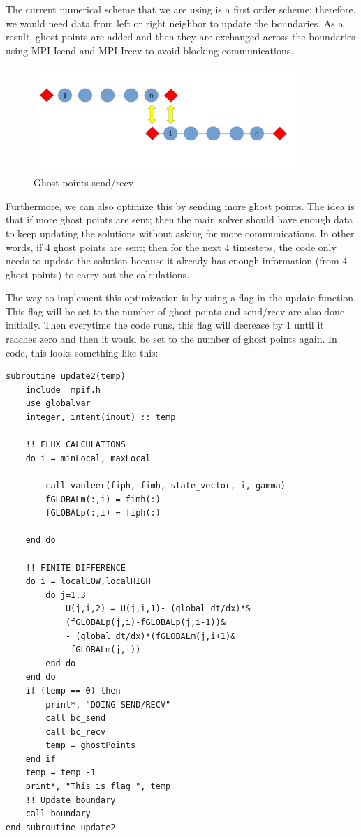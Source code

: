 \documentclass[12pt]{article}
\begin{document}
    \noindent
    The current numerical scheme that we are using is a first order scheme; therefore, we would need data from left or right neighbor to update the boundaries.  As a result, ghost points are added and then they are exchanged across the boundaries using MPI Isend and MPI Irecv to avoid blocking communications.    

    \begin{figure}[H]
        \begin{center}
        \includegraphics[height = 40mm,width = 100mm]{ghost.png}              
        \caption{Ghost points send/recv}
        \end{center}  
    \end{figure}       

    \noindent
    Furthermore, we can also optimize this by sending more ghost points.  The idea is that if more ghost points are sent; then the main solver should have enough data to keep updating the solutions without asking for more communications.  In other words, if 4 ghost points are sent; then for the next 4 timesteps, the code only needs to update the solution because it already has enough information (from 4 ghost points) to carry out the calculations. 

    \noindent \newline
    The way to implement this optimization is by using a flag in the update function. This flag will be set to the number of ghost points and send/recv are also done initially. Then everytime the code runs, this flag will decrease by 1 until it reaches zero and then it would be set to the number of ghost points again.  In code, this looks something like this: 
    
    \begin{lstlisting}
subroutine update2(temp) 
    include 'mpif.h' 
    use globalvar
    integer, intent(inout) :: temp 

    !! FLUX CALCULATIONS 
    do i = minLocal, maxLocal            
        
        call vanleer(fiph, fimh, state_vector, i, gamma)
        fGLOBALm(:,i) = fimh(:)
        fGLOBALp(:,i) = fiph(:)

    end do

    !! FINITE DIFFERENCE 
    do i = localLOW,localHIGH 
        do j=1,3
            U(j,i,2) = U(j,i,1)- (global_dt/dx)*&
            (fGLOBALp(j,i)-fGLOBALp(j,i-1))&
            - (global_dt/dx)*(fGLOBALm(j,i+1)&
            -fGLOBALm(j,i))
        end do
    end do
    if (temp == 0) then
        print*, "DOING SEND/RECV" 
        call bc_send 
        call bc_recv
        temp = ghostPoints 
    end if 
    temp = temp -1
    print*, "This is flag ", temp
    !! Update boundary 
    call boundary
end subroutine update2        
    \end{lstlisting}
    \newpage
\end{document}
